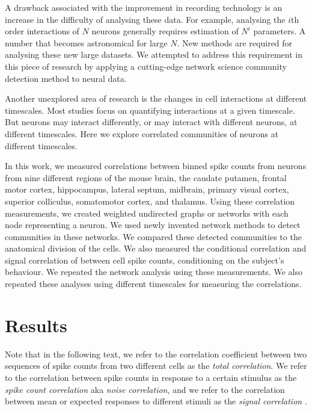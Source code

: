 A drawback associated with the improvement in recording technology is an increase in the difficulty of analysing these data. For example, analysing the $i$th order interactions of $N$ neurons generally requires estimation of $N^i$ parameters. A number that becomes astronomical for large $N$. New methods are required for analysing these new large datasets. We attempted to address this requirement in this piece of research by applying a cutting-edge network science community detection method to neural data.

Another unexplored area of research is the changes in cell interactions at different timescales. Most studies focus on quantifying interactions at a given timescale. But neurons may interact differently, or may interact with different neurons, at different timescales. Here we explore correlated communities of neurons at different timescales.

In this work, we measured correlations between binned spike counts from neurons from nine different regions of the mouse brain, the caudate putamen, frontal motor cortex, hippocampus, lateral septum, midbrain, primary visual cortex, superior colliculus, somatomotor cortex, and thalamus. Using these correlation measurements, we created weighted undirected graphs or networks with each node representing a neuron. We used newly invented network methods to detect communities in these networks. We compared these detected communities to the anatomical division of the cells. We also measured the conditional correlation and signal correlation of between cell spike counts, conditioning on the subject's behaviour. We repeated the network analysis using these measurements. We also repeated these analyses using different timescales for measuring the correlations.

\section{Results}

Note that in the following text, we refer to the correlation coefficient between two sequences of spike counts from two different cells as the \textit{total correlation}. We refer to the correlation between spike counts in response to a certain stimulus as the \textit{spike count correlation} aka \textit{noise correlation}, and we refer to the correlation between mean or expected responses to different stimuli as the \textit{signal correlation} \parencite{cohen2}.

